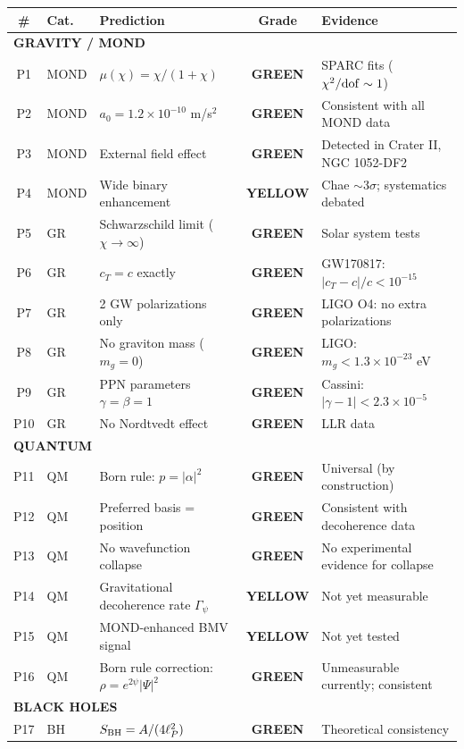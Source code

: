 \documentclass[11pt,a4paper]{article}
\newcommand{\GREEN}{\textcolor{dfdgreen}{\textbf{GREEN}}}
\newcommand{\YELLOW}{\textcolor{dfdyellow}{\textbf{YELLOW}}}
\begin{document}
\begin{center}
\begin{longtable}{clp{5.5cm}cl}
\toprule
\textbf{\#} & \textbf{Cat.} & \textbf{Prediction} & \textbf{Grade} & \textbf{Evidence} \\
\midrule
\endhead
\multicolumn{5}{l}{\textbf{GRAVITY / MOND}} \\
\midrule
P1 & MOND & $\mu(\chi) = \chi/(1+\chi)$ & \GREEN & SPARC fits ($\chi^2/{\rm dof} \sim 1$) \\
P2 & MOND & $a_0 = 1.2 \times 10^{-10}$ m/s$^2$ & \GREEN & Consistent with all MOND data \\
P3 & MOND & External field effect & \GREEN & Detected in Crater II, NGC 1052-DF2 \\
P4 & MOND & Wide binary enhancement & \YELLOW & Chae $\sim 3\sigma$; systematics debated \\
P5 & GR & Schwarzschild limit ($\chi \to \infty$) & \GREEN & Solar system tests \\
P6 & GR & $c_T = c$ exactly & \GREEN & GW170817: $|c_T - c|/c < 10^{-15}$ \\
P7 & GR & 2 GW polarizations only & \GREEN & LIGO O4: no extra polarizations \\
P8 & GR & No graviton mass ($m_g = 0$) & \GREEN & LIGO: $m_g < 1.3 \times 10^{-23}$ eV \\
P9 & GR & PPN parameters $\gamma = \beta = 1$ & \GREEN & Cassini: $|\gamma-1| < 2.3 \times 10^{-5}$ \\
P10 & GR & No Nordtvedt effect & \GREEN & LLR data \\
\midrule
\multicolumn{5}{l}{\textbf{QUANTUM}} \\
\midrule
P11 & QM & Born rule: $p = |\alpha|^2$ & \GREEN & Universal (by construction) \\
P12 & QM & Preferred basis = position & \GREEN & Consistent with decoherence data \\
P13 & QM & No wavefunction collapse & \GREEN & No experimental evidence for collapse \\
P14 & QM & Gravitational decoherence rate $\Gamma_\psi$ & \YELLOW & Not yet measurable \\
P15 & QM & MOND-enhanced BMV signal & \YELLOW & Not yet tested \\
P16 & QM & Born rule correction: $\rho = e^{2\psi}|\Psi|^2$ & \GREEN & Unmeasurable currently; consistent \\
\midrule
\multicolumn{5}{l}{\textbf{BLACK HOLES}} \\
\midrule
P17 & BH & $S_{\rm BH} = A/(4\ell_P^2)$ & \GREEN & Theoretical consistency \\

\end{longtable}
\end{center}
\end{document}
